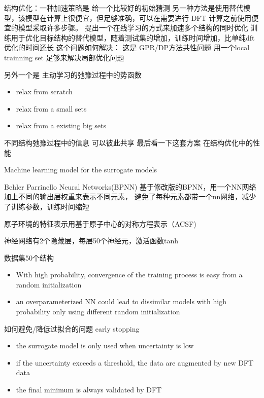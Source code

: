 \documentclass[xcolor=x11names,UTF8]{ctexbeamer}
\begin{document}
\begin{frame}

  结构优化：一种加速策略是 给一个比较好的初始猜测
  另一种方法是使用替代模型，该模型在计算上很便宜，但足够准确，可以在需要进行 DFT 计算之前使用便宜的模型采取许多步骤。
  提出一个在线学习的方式来加速多个结构的同时优化
  训练用于优化目标结构的替代模型，随着测试集的增加，训练时间增加，比单纯dft优化的时间还长
  这个问题如何解决：
  这是 GPR/DP方法共性问题
  用一个local trainning set  足够来解决局部优化问题

  另外一个是 主动学习的弛豫过程中的势函数

  \begin{itemize}
  \item relax from scratch
  \item relax from a small sets
  \item relax from a existing big sets

  \end{itemize}
  不同结构弛豫过程中的信息 可以彼此共享
  最后看一下这套方案 在结构优化中的性能

\end{frame}

\begin{frame}
  Machine learning model for the surrogate models

  Behler Parrinello Neural Networks(BPNN)
  基于修改版的BPNN，用一个NN网络加上不同的输出层权重来表示不同元素，
  避免了每种元素都带一个nn网络，减少了训练参数，训练时间缩短

  原子环境的特征表示用基于原子中心的对称方程表示（ACSF)

  神经网络有2个隐藏层，每层50个神经元，激活函数tanh

  数据集50个结构

    \begin{itemize}
    \item With high probability, convergence of the training process is easy from a random
      initialization
      \item an overparameterized NN could lead to
dissimilar models with high probability only using different
random initialization
\end{itemize}

    如何避免/降低过拟合的问题
    early stopping

    \begin{itemize}
      \item the surrogate model is only used when uncertainty is low
      \item if the uncertainty exceeds a threshold, the data are augmented by new DFT data
      \item the final minimum is always validated by DFT

      \end{itemize}
    \end{frame}
\end{document}
